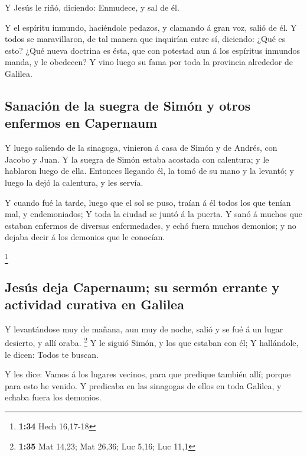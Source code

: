  Y Jesús le riñó, diciendo: Enmudece, y sal de él.

 Y el espíritu inmundo, haciéndole pedazos, y clamando á
gran voz, salió de él.  Y todos se maravillaron, de tal
manera que inquirían entre sí, diciendo: ¿Qué es esto? ¿Qué nueva
doctrina es ésta, que con potestad aun á los espíritus inmundos manda, y
le obedecen?  Y vino luego su fama por toda la provincia
alrededor de Galilea.

\hypertarget{sanaciuxf3n-de-la-suegra-de-simuxf3n-y-otros-enfermos-en-capernaum}{%
\subsection{Sanación de la suegra de Simón y otros enfermos en
Capernaum}\label{sanaciuxf3n-de-la-suegra-de-simuxf3n-y-otros-enfermos-en-capernaum}}

 Y luego saliendo de la sinagoga, vinieron á casa de
Simón y de Andrés, con Jacobo y Juan.  Y la suegra de
Simón estaba acostada con calentura; y le hablaron luego de ella.
 Entonces llegando él, la tomó de su mano y la levantó; y
luego la dejó la calentura, y les servía.

 Y cuando fué la tarde, luego que el sol se puso, traían
á él todos los que tenían mal, y endemoniados;  Y toda la
ciudad se juntó á la puerta.  Y sanó á muchos que estaban
enfermos de diversas enfermedades, y echó fuera muchos demonios; y no
dejaba decir á los demonios que le conocían.

\footnote{\textbf{1:34} Hech 16,17-18}

\hypertarget{jesuxfas-deja-capernaum-su-sermuxf3n-errante-y-actividad-curativa-en-galilea}{%
\subsection{Jesús deja Capernaum; su sermón errante y actividad curativa
en
Galilea}\label{jesuxfas-deja-capernaum-su-sermuxf3n-errante-y-actividad-curativa-en-galilea}}

 Y levantándose muy de mañana, aun muy de noche, salió y
se fué á un lugar desierto, y allí oraba. \footnote{\textbf{1:35} Mat
  14,23; Mat 26,36; Luc 5,16; Luc 11,1}  Y le siguió
Simón, y los que estaban con él;  Y hallándole, le dicen:
Todos te buscan.

 Y les dice: Vamos á los lugares vecinos, para que
predique también allí; porque para esto he venido.  Y
predicaba en las sinagogas de ellos en toda Galilea, y echaba fuera los
demonios.

